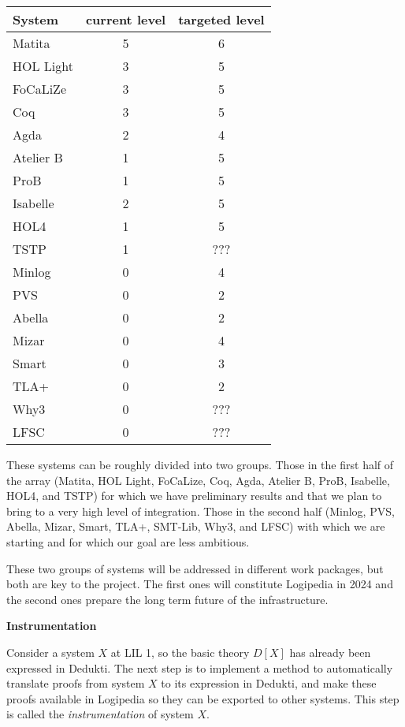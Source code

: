 \begin{center}
\begin{tabular}{|l|c|c|}
\hline
System & current level & targeted level\\
\hline
Matita & 5 & 6\\
\hline
HOL Light & 3 & 5\\
\hline
FoCaLiZe & 3 & 5\\
\hline
Coq & 3 & 5\\
\hline
Agda & 2 & 4\\
\hline
Atelier B & 1 & 5\\
\hline
ProB & 1 & 5\\
\hline
Isabelle & 2 & 5\\
\hline
HOL4 & 1 & 5\\
\hline
TSTP & 1 & {\color{red} ???}\\
\hline
Minlog & 0 & 4\\
\hline
PVS & 0 & 2\\
\hline
Abella & 0 & 2\\
\hline
Mizar & 0 & 4\\
\hline
Smart & 0 & 3\\
\hline
TLA+ & 0 & 2\\
\hline
 Why3 & 0 & {\color{red} ???}\\
\hline
LFSC & 0 & {\color{red} ???}\\
\hline
\end{tabular}
\end{center}

These systems can be roughly divided into two groups. Those in the
first half of the array (Matita, HOL Light, 
  FoCaLize, Coq, Agda, Atelier B, ProB, Isabelle,
HOL4, and TSTP) for which we have preliminary results and
that we plan to bring to a very high level of integration. Those in
the second half (Minlog, PVS, Abella, Mizar,
Smart, TLA+, SMT-Lib, Why3, and LFSC) with which we
are starting and for which our goal are less ambitious.

These two groups of systems will be addressed in different
work packages, but both are key to the project. The first ones will
constitute Logipedia in 2024 and the second ones prepare the
long term future of the infrastructure.

\bigskip

\noindent
{\bf \Large Instrumentation}

\medskip

Consider a system $X$ at LIL 1, so the basic theory $D[X]$ has
already been expressed in Dedukti. The next step is to implement a
method to automatically translate proofs from system $X$ to its
expression in Dedukti, and make these proofs available in Logipedia so
they can be exported to other systems. This step is called the
\emph{instrumentation} of system $X$.


